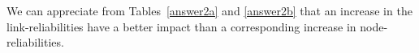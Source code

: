 We can appreciate from Tables~\ref{answer2a} and \ref{answer2b} that an increase in the link-reliabilities 
have a better impact than a corresponding increase in node-reliabilities. 

%
%
%
%
